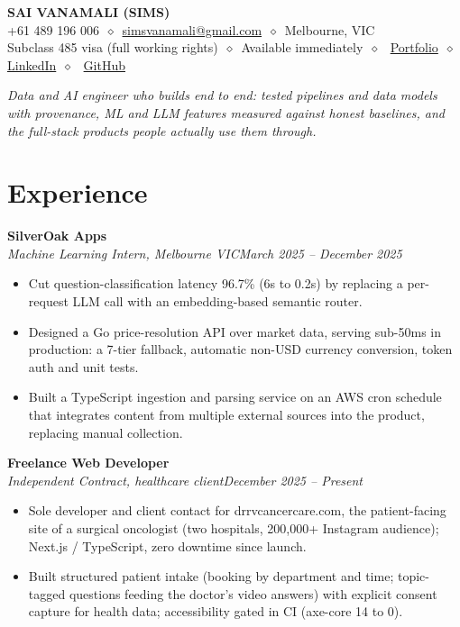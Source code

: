 \documentclass[10pt,a4paper]{article}
\newcommand{\sep}{\ $\diamond$\ }
\newcommand{\role}[3]{%
  \textbf{#1}\\[-1pt]
  \textit{#2}\hfill\textit{#3}\\[-12pt]}
\begin{document}
\begin{center}
  {\LARGE\bfseries SAI VANAMALI (SIMS)}\\[3pt]
  +61 489 196 006\sep\href{mailto:simsvanamali@gmail.com}{simsvanamali@gmail.com}\sep Melbourne, VIC\\[1pt]
  Subclass 485 visa (full working rights)\sep Available immediately\sep
  \href{https://www.simsdoesdata.me}{Portfolio}\sep
  \href{https://www.linkedin.com/in/van-sims}{LinkedIn}\sep
  \href{https://github.com/Vanamali-Sims}{GitHub}
\end{center}

\vspace{2pt}
\begin{center}
\begin{minipage}{0.95\linewidth}
\centering\small\itshape
Data and AI engineer who builds end to end: tested pipelines and data models with provenance, ML and LLM features
measured against honest baselines, and the full-stack products people actually use them through.
\end{minipage}
\end{center}

\vspace{-8pt}
\section{Experience}

\role{SilverOak Apps}{Machine Learning Intern, Melbourne VIC}{March 2025 -- December 2025}
\begin{itemize}
  \item Cut question-classification latency 96.7\% (6s to 0.2s) by replacing a per-request LLM call with an embedding-based
        semantic router.
  \item Designed a Go price-resolution API over market data, serving sub-50ms in production: a 7-tier fallback, automatic
        non-USD currency conversion, token auth and unit tests.
  \item Built a TypeScript ingestion and parsing service on an AWS cron schedule that integrates content from multiple
        external sources into the product, replacing manual collection.
\end{itemize}

\role{Freelance Web Developer}{Independent Contract, healthcare client}{December 2025 -- Present}
\begin{itemize}
  \item Sole developer and client contact for drrvcancercare.com, the patient-facing site of a surgical oncologist (two
        hospitals, 200,000+ Instagram audience); Next.js / TypeScript, zero downtime since launch.
  \item Built structured patient intake (booking by department and time; topic-tagged questions feeding the doctor's video
        answers) with explicit consent capture for health data; accessibility gated in CI (axe-core 14 to 0).
\end{itemize}
\end{document}
